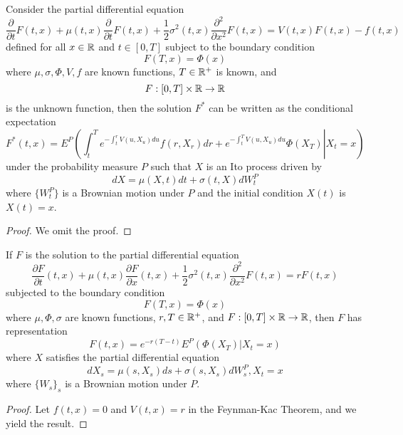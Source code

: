 \documentclass[11pt,fleqn]{book} %
\begin{document}
\begin{theorem} \label{thm:415}
Consider the partial differential equation
\[
\frac{\partial}{\partial t}F(t, x) + \mu(t, x)\frac{\partial}{\partial t} F(t, x) + \frac12\sigma^2(t, x)\frac{\partial^2}{\partial x^2}F(t, x) = V(t, x)F(t, x) - f(t, x)
\]
defined for all \(x \in \mathbb{R}\) and \(t \in [0, T]\) subject to the boundary condition
\[
F(T, x) = \Phi(x)
\]
where \(\mu, \sigma, \Phi, V, f\) are known functions, \(T \in \mathbb{R}^+\) is known, and
\[
F:[0, T] \times \mathbb{R} \rightarrow \mathbb{R}
\]
is the unknown function, then the solution \(F^*\) can be written as the conditional expectation
\[
F^*(t, x) = E^P\left(\left.\int_t^T e^{-\int_t^rV(u, X_u)du}f(r, X_r)dr + e^{-\int_t^T V(u, X_u)du}\Phi(X_T)\right|X_t = x\right)
\]
under the probability measure \(P\) such that \(X\) is an Ito process driven by
\[
dX = \mu(X, t)dt + \sigma(t, X)dW_t^P
\]
where \(\{W_t^P\}\) is a Brownian motion under \(P\) and the initial condition \(X(t)\) is \(X(t) = x\).
\end{theorem}
\begin{proof}
    We omit the proof.
\end{proof}

\begin{corollary} \label{cor:417}
If \(F\) is the solution to the partial differential equation
\[
\frac{\partial F}{\partial t}(t, x) + \mu(t, x)\frac{\partial F}{\partial x}(t, x) + \frac12\sigma^2(t, x)\frac{\partial^2}{\partial x^2}F(t, x) = rF(t, x)
\]
subjected to the boundary condition
\[
F(T, x) = \Phi(x)
\]
where \(\mu, \Phi, \sigma\) are known functions, \(r, T \in \mathbb{R}^+\), and \(F:[0, T]\times\mathbb{R}\rightarrow\mathbb{R}\), then \(F\) has representation
\[
F(t, x) = e^{-r(T - t)}E^P(\Phi(X_T) | X_t = x)
\]
where \(X\) satisfies the partial differential equation
\[
dX_s = \mu(s, X_s)ds + \sigma(s, X_s)dW_s^P, X_t = x
\]
where \(\{W_s\}_s\) is a Brownian motion under \(P\).
\end{corollary}
\begin{proof}
    Let \(f(t, x) = 0\) and \(V(t, x) = r\) in the Feynman-Kac Theorem, and we yield the result.
\end{proof}
\end{document}
